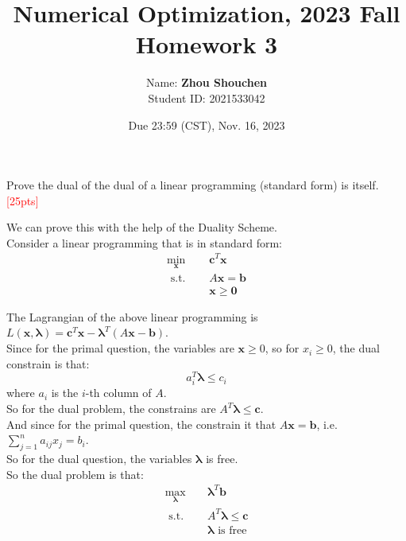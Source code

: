 \documentclass[10pt]{article}
\newenvironment{problem}[2][Problem]{\begin{trivlist}
\item[\hskip \labelsep {\bfseries #1}\hskip \labelsep {\bfseries #2.}]}{\end{trivlist}}
\begin{document}
\title{	Numerical Optimization, 2023 Fall\\Homework 3}
\date{Due 23:59 (CST), Nov. 16, 2023 }

\author{
    Name: \textbf{Zhou Shouchen} \\
	Student ID: 2021533042
}

\maketitle
\newpage


\begin{problem}{1}
    Prove the dual of the dual of a linear programming (standard form) is itself.\textcolor{red}{[25pts]}
\end{problem}
We can prove this with the help of the Duality Scheme.\\
Consider a linear programming that is in standard form:\\
\begin{equation}
\begin{aligned}
\min_{\bm{x}} \quad & \bm{c}^T\bm{x} \\
\text { s.t. } \quad & A\bm{x} = \bm{b} \\
& \bm{x} \geq \bm{0}
\end{aligned}
\end{equation}

The Lagrangian of the above linear programming is $L(\bm{x},\bm{\lambda}) = \bm{c}^T\bm{x} - \bm{\lambda}^T(A\bm{x} - \bm{b})$.\\

Since for the primal question, the variables are $\bm{x}\geq 0$, so for $x_i\geq 0$, the dual constrain is that:\\
$$a_i^T\bm{\lambda} \leq c_i$$
where $a_i$ is the $i$-th column of $A$.\\

So for the dual problem, the constrains are $A^T\bm{\lambda} \leq \bm{c}$.\\

And since for the primal question, the constrain it that $A\bm{x} = \bm{b}$, i.e.$\sum\limits_{j=1}^na_{ij}x_j=b_i$.\\
So for the dual question, the variables $\bm{\lambda}$ is free.\\

So the dual problem is that:\\
\begin{equation}
\begin{aligned}
\max_{\bm{\lambda}} \quad & \bm{\lambda}^T\bm{b} \\
\text { s.t. } \quad & A^T\bm{\lambda} \leq \bm{c} \\
& \bm{\lambda} \text{ is free}
\end{aligned}
\end{equation}
\end{document}
